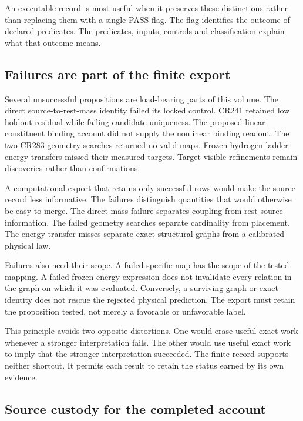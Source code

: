 An executable record is most useful when it preserves these distinctions rather than replacing them with a single PASS flag. The flag identifies the outcome of declared predicates. The predicates, inputs, controls and classification explain what that outcome means.

\subsection{Failures are part of the finite export}

Several unsuccessful propositions are load-bearing parts of this volume. The direct source-to-rest-mass identity failed its locked control. CR241 retained low holdout residual while failing candidate uniqueness. The proposed linear constituent binding account did not supply the nonlinear binding readout. The two CR283 geometry searches returned no valid maps. Frozen hydrogen-ladder energy transfers missed their measured targets. Target-visible refinements remain discoveries rather than confirmations.

A computational export that retains only successful rows would make the source record less informative. The failures distinguish quantities that would otherwise be easy to merge. The direct mass failure separates coupling from rest-source information. The failed geometry searches separate cardinality from placement. The energy-transfer misses separate exact structural graphs from a calibrated physical law.

Failures also need their scope. A failed specific map has the scope of the tested mapping. A failed frozen energy expression does not invalidate every relation in the graph on which it was evaluated. Conversely, a surviving graph or exact identity does not rescue the rejected physical prediction. The export must retain the proposition tested, not merely a favorable or unfavorable label.

This principle avoids two opposite distortions. One would erase useful exact work whenever a stronger interpretation fails. The other would use useful exact work to imply that the stronger interpretation succeeded. The finite record supports neither shortcut. It permits each result to retain the status earned by its own evidence.

\subsection{Source custody for the completed account}

